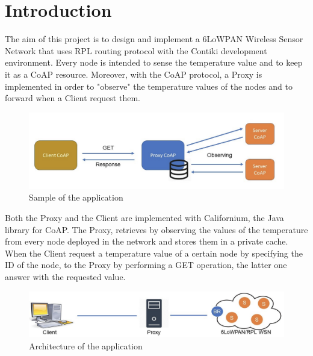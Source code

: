 \documentclass[10pt,english, openany]{book}
\begin{document}
\tableofcontents{}

\mainmatter

\chapter{Introduction}\label{chapt:sum}

The aim of this project is to design and implement a 6LoWPAN Wireless Sensor Network that uses RPL routing protocol with the Contiki development environment.
Every node is intended to sense the temperature value and to keep it as a CoAP resource. Moreover, with the CoAP protocol, a Proxy is implemented in order to "observe" the temperature values of the nodes and to forward when a Client request them.


\begin{figure}[h]
\centering
\includegraphics[scale=0.4]{application.png}
\caption{Sample of the application}
\end{figure}

Both the Proxy and the Client are implemented with Californium, the Java library for CoAP.
The Proxy, retrieves by observing the values of the temperature from every node deployed in the network and stores them in a private cache. When the Client request a temperature value of a certain node by specifying the ID of the node, to the Proxy by performing a GET operation, the latter one answer with the requested value.

\begin{figure}[h]
\centering
\includegraphics[scale=0.4]{architecture.png}
\caption{Architecture of the application}
\end{figure}
\end{document}
